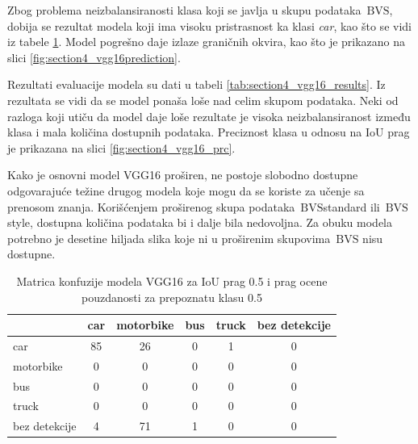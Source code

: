 \documentclass[12pt,oneside]{memoir}
\newcommand{\bvs}{\ensuremath{\,\textrm{BVS}}}
\begin{document}
Zbog problema neizbalansiranosti klasa koji se javlja u skupu podataka \bvs, dobija se rezultat modela koji ima visoku pristrasnost ka klasi \textit{car}, kao što se vidi iz tabele \ref{tab:section4_vgg16_confusionmatrix}. Model pogrešno daje izlaze graničnih okvira, kao što je prikazano na slici \ref{fig:section4_vgg16prediction}.

Rezultati evaluacije modela su dati u tabeli \ref{tab:section4_vgg16_results}. Iz rezultata se vidi da se model ponaša loše nad celim skupom podataka. Neki od razloga koji utiču da model daje loše rezultate je visoka neizbalansiranost između klasa i mala količina dostupnih podataka.%
Preciznost klasa u odnosu na IoU prag je prikazana na slici \ref{fig:section4_vgg16_prc}.

Kako je osnovni model VGG16 proširen, ne postoje slobodno dostupne odgovarajuće težine drugog modela koje mogu da se koriste za učenje sa prenosom znanja.
Korišćenjem proširenog skupa podataka \bvs{standard} ili \bvs{style}, dostupna količina podataka bi i dalje bila nedovoljna. Za obuku modela potrebno je desetine hiljada slika koje ni u proširenim skupovima \bvs{} nisu dostupne.


\begin{table}[h!]
    \begin{center}
    \caption{Matrica konfuzije modela VGG16 za IoU prag 0.5 i prag ocene pouzdanosti za prepoznatu klasu 0.5}
    \begin{tabular}{ l|c|c|c|c|c|}
                  & car  & motorbike & bus & truck & bez detekcije \\ \hline
    car           & 85   & 26        & 0   & 1     & 0             \\ 
    motorbike     & 0    & 0         & 0   & 0     & 0             \\ 
    bus           & 0    & 0         & 0   & 0     & 0             \\ 
    truck         & 0    & 0         & 0   & 0     & 0             \\ 
    bez detekcije & 4    & 71        & 1   & 0     & 0             \\ \hline
    \hline
    \end{tabular}
    \label{tab:section4_vgg16_confusionmatrix}
    \end{center}
\end{table}
\end{document}
